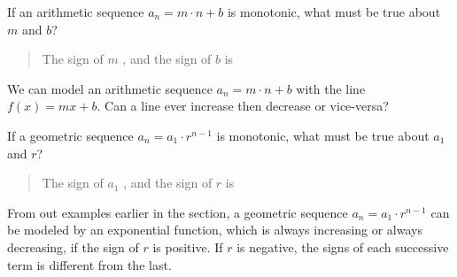 \documentclass{ximera}
\begin{document}
\begin{question}
  If an arithmetic sequence $a_n = m\cdot n + b$ is monotonic, what
  must be true about $m$ and $b$?
  \begin{prompt}
    \begin{quote}
      The sign of $m$ , and the sign of $b$ is
    \end{quote}
  \end{prompt}
  \begin{feedback}
   We can model an arithmetic sequence $a_n = m\cdot n + b$ with the line $f(x) = mx+b$.  Can a line ever increase then decrease or vice-versa? 
  \end{feedback}
\end{question}

\begin{question}
  If a geometric sequence $a_n = a_1 \cdot r^{n-1}$ is monotonic, what
  must be true about $a_1$ and $r$?
  \begin{prompt}
    \begin{quote}
      The sign of $a_1$ , and the sign of
      $r$ is 
    \end{quote}
  \end{prompt}
    \begin{feedback}
    From out examples earlier in the section, a geometric sequence $a_n = a_1 \cdot r^{n-1}$ can be modeled by an exponential function, which is always increasing or always decreasing, if the sign of $r$ is positive.  If $r$ is negative, the signs of each successive term is different from the last.
  \end{feedback}
\end{question}
\end{document}
